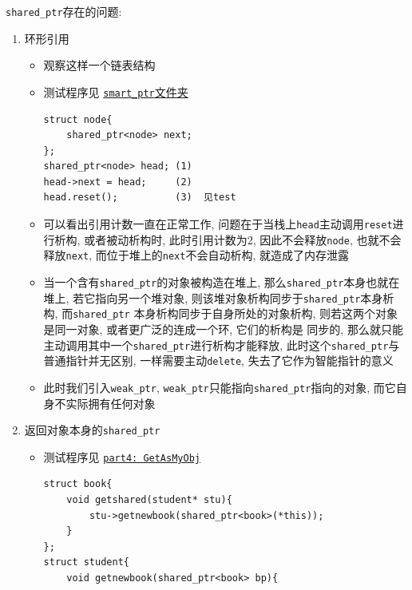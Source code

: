 {\tt shared\_ptr}存在的问题:
\begin{enumerate}
	\item 环形引用
	\begin{itemize}
		\item 观察这样一个链表结构
		\item 测试程序见 \href{https://github.com/wenqinqian/Obtuse/blob/main/test/cpp/c++11/smart_ptr/ring_reference_test.cpp}{{\tt smart\_ptr}文件夹}
		\begin{lstlisting}
struct node{ 				
	shared_ptr<node> next;  
};							
shared_ptr<node> head; (1)  
head->next = head;	   (2)	
head.reset();		   (3)	见test
		\end{lstlisting}
		
		
		
		\item 可以看出引用计数一直在正常工作, 问题在于当栈上{\tt head}主动调用{\tt reset}进行析构, 
				或者被动析构时, 此时引用计数为2, 因此不会释放{\tt node}, 也就不会释放{\tt next},
				而位于堆上的{\tt next}不会自动析构, 就造成了内存泄露
		\item 当一个含有{\tt shared\_ptr}的对象被构造在堆上, 那么{\tt shared\_ptr}本身也就在堆上, 
				若它指向另一个堆对象, 则该堆对象析构同步于{\tt shared\_ptr}本身析构, 而{\tt shared\_ptr}
				本身析构同步于自身所处的对象析构, 则若这两个对象是同一对象, 或者更广泛的连成一个环, 它们的析构是
				同步的, 那么就只能主动调用其中一个{\tt shared\_ptr}进行析构才能释放, 此时这个{\tt shared\_ptr}与
				普通指针并无区别, 一样需要主动{\tt delete}, 失去了它作为智能指针的意义
		\item 此时我们引入{\tt weak\_ptr}, {\tt weak\_ptr}只能指向{\tt shared\_ptr}指向的对象, 而它自身不实际拥有任何对象
		
		
		
	\end{itemize}
	\item 返回对象本身的{\tt shared\_ptr}
	\begin{itemize}
		\item 测试程序见 \href{https://github.com/wenqinqian/Obtuse/blob/main/test/cpp/c++11/smart_ptr/shared_ptr_teset.cpp}{{\tt part4: GetAsMyObj}}
		\begin{lstlisting}
struct book{
	void getshared(student* stu){
		stu->getnewbook(shared_ptr<book>(*this));
	}
};
struct student{
	void getnewbook(shared_ptr<book> bp){

\end{lstlisting}
\end{itemize}
\end{enumerate}
